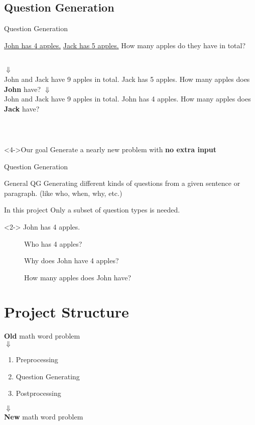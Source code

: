 \documentclass[11pt]{beamer}
\begin{document}
\subsection{Question Generation}
\begin{frame}{Question Generation}
    \begin{example}
    \underline{John has \alert{4} apples.}
    \underline{Jack has \alert{5} apples.} How many apples do they have in total?
    \end{example}
    \begin{columns}
    $\Downarrow$
    ~\\
    John and Jack have 9 apples in total. Jack has 5 apples. How many apples does \textbf{John} have?
    $\Downarrow$
    ~\\
    John and Jack have 9 apples in total. John has 4 apples. How many apples does \textbf{Jack} have?
    \end{columns}
    ~\\
    \begin{block}<4->{Our goal}
    Generate a nearly new problem with \textbf{no extra input}
    \end{block}
\end{frame}

\begin{frame}{Question Generation}
    \begin{block}{General QG}
    Generating different kinds of questions from a given sentence or paragraph. (like who, when, why, etc.)
    \end{block}
    \begin{block}{In this project}
    Only a subset of question types is needed.
    \begin{example}<2->
        John has 4 apples.
        \begin{description}
        \item[] Who has 4 apples?
        \item[] Why does John have 4 apples?
        \item[] How many apples does John have?
        \end{description}
    \end{example}
    \end{block}
\end{frame}

\section{Project Structure}
\begin{frame}
\textbf{Old} math word problem\\
$\Downarrow$\\
\begin{enumerate}
    \item Preprocessing
    \item Question Generating
    \item Postprocessing
\end{enumerate}
$\Downarrow$\\
\textbf{New} math word problem
\end{frame}
\end{document}
